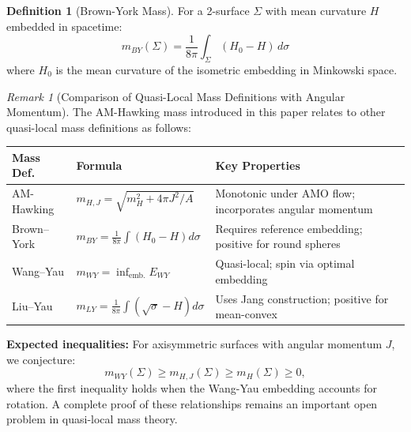 \documentclass[12pt]{article}
\theoremstyle{plain}
\theoremstyle{definition}
\newtheorem{definition}[theorem]{Definition}
\theoremstyle{remark}
\newtheorem{remark}[theorem]{Remark}
\begin{document}
\begin{definition}[Brown-York Mass]
For a 2-surface $\Sigma$ with mean curvature $H$ embedded in spacetime:
\begin{equation}
m_{BY}(\Sigma) = \frac{1}{8\pi}\int_\Sigma (H_0 - H) \, d\sigma
\end{equation}
where $H_0$ is the mean curvature of the isometric embedding in Minkowski space.
\end{definition}

\begin{remark}[Comparison of Quasi-Local Mass Definitions with Angular Momentum]
The AM-Hawking mass introduced in this paper relates to other quasi-local mass definitions as follows:

\begin{center}
\small
\begin{tabular}{@{}p{2.5cm}p{4.5cm}p{5.2cm}@{}}
\toprule
\textbf{Mass Def.} & \textbf{Formula} & \textbf{Key Properties} \\
\midrule
AM-Hawking & $m_{H,J} = \sqrt{m_H^2 + 4\pi J^2/A}$ & Monotonic under AMO flow; incorporates angular momentum \\
\midrule
Brown--York & $m_{BY} = \frac{1}{8\pi}\int(H_0 - H)d\sigma$ & Requires reference embedding; positive for round spheres \\
\midrule
Wang--Yau & $m_{WY} = \inf_{\text{emb.}} E_{WY}$ & Quasi-local; spin via optimal embedding \\
\midrule
Liu--Yau & $m_{LY} = \frac{1}{8\pi}\int(\sqrt{\sigma} - H)d\sigma$ & Uses Jang construction; positive for mean-convex \\
\bottomrule
\end{tabular}
\label{tab:quasilocal-comparison}
\end{center}

\textbf{Expected inequalities:} For axisymmetric surfaces with angular momentum $J$, we conjecture:
\begin{equation}
m_{WY}(\Sigma) \geq m_{H,J}(\Sigma) \geq m_H(\Sigma) \geq 0,
\end{equation}
where the first inequality holds when the Wang-Yau embedding accounts for rotation. A complete proof of these relationships remains an important open problem in quasi-local mass theory.
\end{remark}
\end{document}
